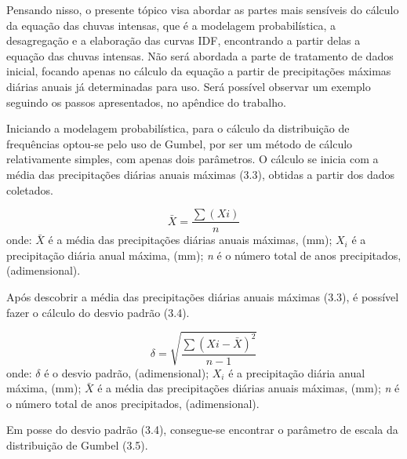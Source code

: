 Pensando nisso, o presente tópico visa abordar as partes mais sensíveis do cálculo da equação das chuvas intensas, que é a modelagem probabilística, a desagregação e a elaboração das curvas IDF, encontrando a partir delas a equação das chuvas intensas. Não será abordada a parte de tratamento de dados inicial, focando apenas no cálculo da equação a partir de precipitações máximas diárias anuais já determinadas para uso. Será possível observar um exemplo seguindo os passos apresentados, no apêndice do trabalho. \bigskip


Iniciando a modelagem probabilística, para o cálculo da distribuição de frequências optou-se pelo uso de Gumbel, por ser um método de cálculo relativamente simples, com apenas dois parâmetros. O cálculo se inicia com a média das precipitações diárias anuais máximas (3.3), obtidas a partir dos dados coletados.\bigskip

\newpage

\begin{equation}
\bar{X} = \frac{\sum(Xi)}{n}
\end{equation}
\newline
onde:
\newline
$\bar{X}$ é a média das precipitações diárias anuais máximas, (mm);
\newline
$X_i$ é a precipitação diária anual máxima, (mm);
\newline
\textit{n} é o número total de anos precipitados, (adimensional).\bigskip
 
Após descobrir a média das precipitações diárias anuais máximas (3.3), é possível fazer o cálculo do desvio padrão (3.4).\bigskip

\begin{equation}
\delta = \sqrt{\frac{\sum(Xi - \bar{X})^2}{n - 1}}
\end{equation}
\newline
onde:
\newline
$\delta$ é o desvio padrão, (adimensional);
\newline
$X_i$ é a precipitação diária anual máxima, (mm);
\newline
$\bar{X}$ é a média das precipitações diárias anuais máximas, (mm);
\newline
\textit{n} é o número total de anos precipitados, (adimensional).\bigskip

Em posse do desvio padrão (3.4), consegue-se encontrar o parâmetro de escala da distribuição de Gumbel (3.5).\bigskip

